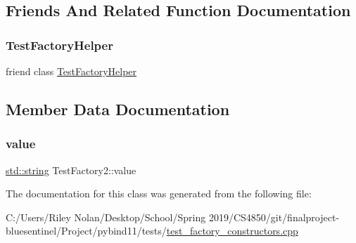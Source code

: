 \subsection{Friends And Related Function Documentation}
\mbox{\label{class_test_factory2_adc15c60543a15213908f8668bd10792b}} 
\subsubsection{\texorpdfstring{TestFactoryHelper}{TestFactoryHelper}}
{\footnotesize\ttfamily friend class \mbox{\hyperlink{class_test_factory_helper}{Test\+Factory\+Helper}}\hspace{0.3cm}{\ttfamily [friend]}}



\subsection{Member Data Documentation}
\mbox{\label{class_test_factory2_ad84cc2c3de69188fba2d5598ad40faaf}} 
\subsubsection{\texorpdfstring{value}{value}}
{\footnotesize\ttfamily \mbox{\hyperlink{_s_d_l__opengl__glext_8h_ab4ccfaa8ab0e1afaae94dc96ef52dde1}{std\+::string}} Test\+Factory2\+::value}



The documentation for this class was generated from the following file\+:\begin{DoxyCompactItemize}
\item 
C\+:/\+Users/\+Riley Nolan/\+Desktop/\+School/\+Spring 2019/\+C\+S4850/git/finalproject-\/bluesentinel/\+Project/pybind11/tests/\mbox{\hyperlink{test__factory__constructors_8cpp}{test\+\_\+factory\+\_\+constructors.\+cpp}}\end{DoxyCompactItemize}
